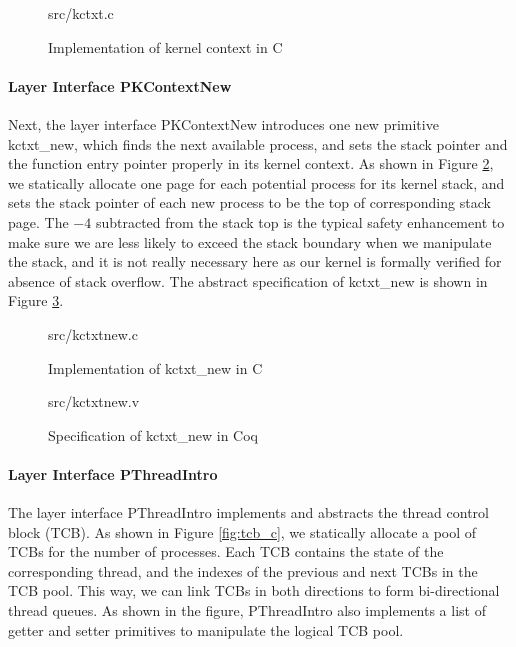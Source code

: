 \begin{figure}
	 {src/kctxt.c}
	\caption{Implementation of kernel context in C}
	\label{fig:kctxt_c}
\end{figure}


\paragraph{Layer Interface PKContextNew}

Next, the layer interface PKContextNew introduces one new primitive \textsf{kctxt\_new}, which finds the next
available process, and sets the stack pointer and the function entry pointer properly in its kernel context.
As shown in Figure \ref{fig:kctxtnew_c}, we statically allocate one page for each potential process for its kernel
stack, and sets the stack pointer of each new process to be the top of corresponding stack page.
The $-4$ subtracted from the stack top is the typical safety enhancement to make sure we are less likely to
exceed the stack boundary when we manipulate the stack, and it is not really necessary here as our kernel
is formally verified for absence of stack overflow.
The abstract specification of \textsf{kctxt\_new} is shown in Figure \ref{fig:kctxtnew_v}.

\begin{figure}
	 {src/kctxtnew.c}
	\caption{Implementation of \textsf{kctxt\_new} in C}
	\label{fig:kctxtnew_c}
\end{figure}

\begin{figure}
	 {src/kctxtnew.v}
	\caption{Specification of \textsf{kctxt\_new} in Coq}
	\label{fig:kctxtnew_v}
\end{figure}


\paragraph{Layer Interface PThreadIntro}

The layer interface PThreadIntro implements and abstracts the thread control block (TCB).
As shown in Figure \ref{fig:tcb_c}, we statically allocate a pool of TCBs for the number of
processes. Each TCB contains the state of the corresponding thread, and the indexes of
the previous and next TCBs in the TCB pool. This way, we can link TCBs in both directions
to form bi-directional thread queues. As shown in the figure, PThreadIntro also implements
a list of getter and setter primitives to manipulate the logical TCB pool.

